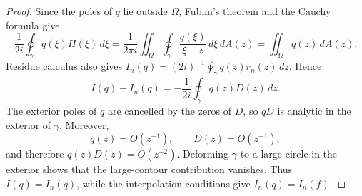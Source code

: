 \documentclass[10pt,a4paper]{amsart}
\begin{document}
\begin{proof}
Since the poles of $q$ lie outside $\bar\Omega$, Fubini's theorem and
the Cauchy formula give
\[
\frac{1}{2i}\oint_\gamma q(\xi)H(\xi)\,d\xi
 =\frac{1}{2\pi i}\iint_\Omega
   \oint_\gamma \frac{q(\xi)}{\xi-z}\,d\xi\,dA(z)
 =\iint_\Omega q(z)\,dA(z).
\]
Residue calculus also gives
$I_n(q)=(2i)^{-1}\oint_\gamma q(z)r_n(z)\,dz$. Hence
\[
I(q)-I_n(q)
  =-\frac{1}{2i}\oint_\gamma q(z)D(z)\,dz.
\]
The exterior poles of $q$ are cancelled by the zeros of $D$, so $qD$
is analytic in the exterior of $\gamma$. Moreover,
\[
  q(z)=O(z^{-1}),\qquad D(z)=O(z^{-1}),
\]
and therefore $q(z)D(z)=O(z^{-2})$. Deforming $\gamma$ to a large
circle in the exterior shows that the large-contour contribution
vanishes. Thus
$I(q)=I_n(q)$, while the interpolation conditions give
$I_n(q)=I_n(f)$.
\end{proof}
\end{document}
